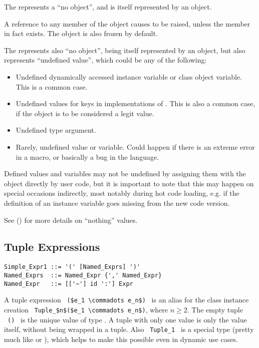 The  represents a ``no object'', and is itself represented by an object. 

A reference to any member of the  object causes  to be raised, unless the member in fact exists. The  object is also frozen by default. 

The  represents also ``no object'', being itself represented by an object, but also represents ``undefined value'', which could be any of the following:
\begin{itemize}
  \item Undefined dynamically accessed instance variable or class object variable. This is a common case. 
  \item Undefined values for keys in implementations of . This is also a common case, if the  object is to be considered a legit value. 
  \item Undefined type argument.
  \item Rarely, undefined value or variable. Could happen if there is an extreme error in a macro, or basically a bug in the language. 
\end{itemize}

Defined values and variables may not be undefined by assigning them with the  object directly by user code, but it is important to note that this may happen on special occasions indirectly, most notably during hot code loading, e.g. if the definition of an instance variable goes missing from the new code version. 

See () for more details on ``nothing'' values. 





\subsection{Tuple Expressions}
\label{sec:tuples}

\syntax\begin{lstlisting}
Simple_Expr1 ::= '(' [Named_Exprs] ')'
Named_Exprs  ::= Named_Expr {',' Named_Expr}
Named_Expr   ::= [['~'] id ':'] Expr
\end{lstlisting}

A tuple expression ~\lstinline!($e_1 \commadots e_n$)!~ is an alias for the class instance creation ~\lstinline!Tuple_$n$($e_1 \commadots e_n$)!, where $n \geq 2$. The empty tuple ~\lstinline!()!~ is the unique value of type . A tuple with only one value is only the value itself, without being wrapped in a tuple. Also ~\lstinline!Tuple_1!~ is a special type (pretty much like  or ), which helps to make this possible even in dynamic use cases. 

